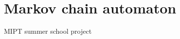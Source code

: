 \chapter{Markov chain automaton}
\hypertarget{index}{}\label{index}
\label{index_md__r_e_a_d_m_e}%
%
 MIPT summer school project 